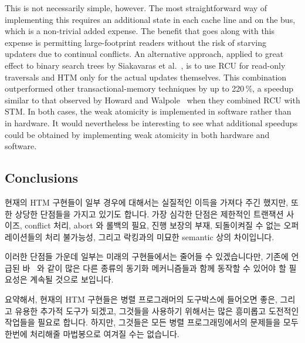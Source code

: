 This is not necessarily simple, however.
The most straightforward way of implementing this requires an additional
state in each cache line and on the bus, which is a non-trivial added
expense.
The benefit that goes along with this expense is permitting
large-footprint readers without the risk of starving updaters due
to continual conflicts.
An alternative approach, applied to great effect to binary search trees
by Siakavaras et al.~\cite{Siakavaras2017CombiningHA},
is to use RCU for read-only traversals and HTM
only for the actual updates themselves.
This combination outperformed other transactional-memory techniques by
up to 220\,\%, a speedup similar to that observed by
Howard and Walpole~\cite{PhilHoward2011RCUTMRBTree}
when they combined RCU with STM.
In both cases, the weak atomicity is implemented in software rather than
in hardware.
It would nevertheless be interesting to see what additional speedups
could be obtained by implementing weak atomicity in both hardware and
software.
\fi

\subsection{Conclusions}
\label{sec:future:Conclusions}

현재의 HTM 구현들이 일부 경우에 대해서는 실질적인 이득을 가져다 주긴 했지만,
또한 상당한 단점들을 가지고 있기도 합니다.
가장 심각한 단점은 제한적인 트랜잭션 사이즈, conflict 처리, abort 와 롤백의
필요, 진행 보장의 부재, 되돌이켜질 수 없는 오퍼레이션들의 처리 불가능성, 그리고
락킹과의 미묘한 semantic 상의 차이입니다.
\iffalse

Although current HTM implementations have delivered real performance
benefits in some situations, they also have significant shortcomings.
The most significant shortcomings appear to be
limited transaction sizes,
the need for conflict handling, the need for aborts and rollbacks,
the lack of forward-progress guarantees,
the inability to handle irrevocable operations,
and subtle semantic differences
from locking.
\fi

이러한 단점들 가운데 일부는 미래의 구현들에서는 줄어들 수 있겠습니다만, 기존에
언급된 바~\cite{McKenney2007PLOSTM,PaulEMcKenney2010OSRGrassGreener} 와 같이
많은 다른 종류의 동기화 메커니즘들과 함께 동작할 수 있어야 할 필요성은 계속될
것으로 보입니다.

요약해서, 현재의 HTM 구현들은 병렬 프로그래머의 도구박스에 들어오면 좋은,
그리고 유용한 추가적 도구가 되겠고, 그것들을 사용하기 위해서는 많은 흥미롭고
도전적인 작업들을 필요로 합니다.
하지만, 그것들은 모든 병렬 프로그래밍에서의 문제들을 모두 한번에 처리해줄
마법봉으로 여겨질 수는 없습니다.
\iffalse

